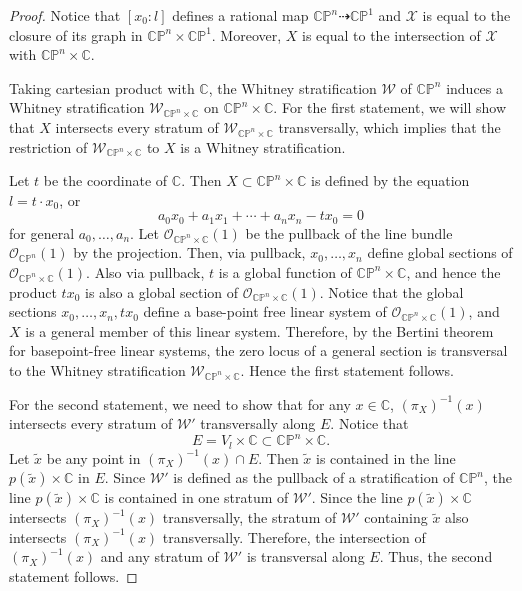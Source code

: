 \documentclass[12pt,leqno,twoside]{amsart}
\theoremstyle{plain}
\theoremstyle{definition}
\newcommand{\CP}{\mathbb{CP}}
\newcommand{\C}{\mathbb{C}}
\newcommand{\cX}{\mathcal{X}}
\begin{document}
\begin{proof}
Notice that $[x_0:l]$ defines a rational map $\CP^n\dashrightarrow \CP^1$ and $\cX$ is equal to the closure of its graph in $\CP^n\times \CP^1$. Moreover, $X$ is equal to the intersection of $\cX$ with $\CP^n\times \C$. 

Taking cartesian product with $\C$, the Whitney stratification $\mathcal{W}$ of $\CP^n$ induces a Whitney stratification $\mathcal{W}_{\CP^n\times \C}$ on $\CP^n\times \C$. For the first statement, we will show that $X$ intersects every stratum of $\mathcal{W}_{\CP^n\times \C}$ transversally, which implies that the restriction of $\mathcal{W}_{\CP^n\times \C}$ to $X$ is a Whitney stratification. 

Let $t$ be the coordinate of $\C$. Then $X \subset \CP^n\times \C$ is defined by the equation $l=t \cdot x_0$, or
\[
a_0x_0+a_1x_1+\cdots +a_nx_n-t x_0=0
\]
for general $a_0, \dots, a_n$. Let $\mathcal{O}_{\CP^n\times \C}(1)$ be the pullback of the line bundle $\mathcal{O}_{\CP^n}(1)$ by the projection. Then, via pullback, $x_0, \dots, x_n$ define global sections of $\mathcal{O}_{\CP^n\times \C}(1)$. Also via pullback, $t$ is a global function of $\CP^n\times \C$, and hence the product $t x_0$ is also a global section of $\mathcal{O}_{\CP^n\times \C}(1)$. Notice that the global sections $x_0, \dots, x_n, tx_0$ define a base-point free linear system of $\mathcal{O}_{\CP^n\times \C}(1)$, and $X$ is  a general member of this linear system. Therefore, by the Bertini theorem for basepoint-free linear systems, the zero locus of a general section is transversal to the Whitney stratification $\mathcal{W}_{\CP^n\times \C}$. Hence the first statement follows. 

For the second statement, we need to show that for any $x\in \C$, $(\pi_X)^{-1}(x)$ intersects every stratum of $\mathcal{W}'$ transversally along $E$. Notice that 
\[
E= V_l\times \C\subset \CP^n\times \C.
\]
Let $\tilde{x}$ be any point in $(\pi_X)^{-1}(x)\cap E$. Then $\tilde{x}$ is contained in the line $p(\tilde{x})\times \C$ in $E$. Since $\mathcal{W}'$ is defined as the pullback of a stratification of $\CP^n$, the line $p(\tilde{x})\times \C$ is contained in one stratum of $\mathcal{W}'$. Since the line $p(\tilde{x})\times \C$ intersects $(\pi_X)^{-1}(x)$ transversally, the stratum of $\mathcal{W}'$ containing $\tilde{x}$ also intersects $(\pi_X)^{-1}(x)$ transversally. Therefore, the intersection of  $(\pi_X)^{-1}(x)$ and any stratum of $\mathcal{W}'$ is transversal along $E$. Thus, the second statement follows. 
\end{proof}
\end{document}
